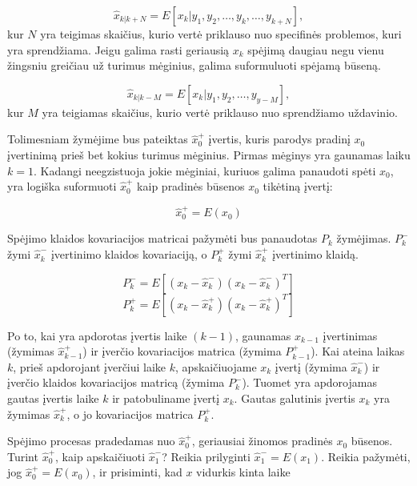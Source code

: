     \begin{equation}
        \hat{x}_{k|k+N} = E[x_k|y_1,y_2,\dots,y_k,\dots, y_{k+N}],
    \end{equation}
    kur $N$ yra teigimas skaičius, kurio vertė priklauso nuo specifinės problemos, kuri yra sprendžiama.
    Jeigu galima rasti geriausią $x_k$ spėjimą daugiau negu vienu žingsniu greičiau už turimus mėginius, galima suformuluoti spėjamą būseną.

    \begin{equation}
        \hat{x}_{k|k-M} = E[x_k|y_1,y_2, \dots, y_{y-M}],
    \end{equation}
    kur $M$ yra teigiamas skaičius, kurio vertė priklauso nuo sprendžiamo uždavinio.

    Tolimesniam žymėjime bus pateiktas $\hat{x}_0^+$ įvertis, kuris parodys pradinį $x_0$ įvertinimą prieš bet kokius turimus mėginius.
    Pirmas mėginys yra gaunamas laiku $k=1$.
    Kadangi neegzistuoja jokie mėginiai, kuriuos galima panaudoti spėti $x_0$, yra logiška suformuoti $\hat{x}^+_0$ kaip pradinės būsenos $x_0$ tikėtiną įvertį:

    \begin{equation}
        \hat{x}_0^+ = E(x_0)
    \end{equation}

    Spėjimo klaidos kovariacijos matricai pažymėti bus panaudotas $P_k$ žymėjimas.
    $P_k^-$ žymi $\hat{x}_k^-$ įvertinimo klaidos kovariaciją, o $P_k^+$ žymi $\hat{x}_k^+$ įvertinimo klaidą.

    \begin{equation}
        P_k^- = E[(x_k - \hat{x}_k^-)(x_k - \hat{x}_k^-)^T]
    \end{equation}
    \begin{equation}
        P_k^+ = E[(x_k - \hat{x}_k^+)(x_k-\hat{x}_k^+)^T]
    \end{equation}

    Po to, kai yra apdorotas įvertis laike $(k-1)$, gaunamas $x_{k-1}$ įvertinimas (žymimas $\hat{x}_{k-1}^+$) ir įverčio kovariacijos matrica (žymima $P_{k-1}^+$).
    Kai ateina laikas $k$, prieš apdorojant įverčiui laike $k$, apskaičiuojame $x_k$ įvertį (žymima $\hat{x}_k^-$) ir įverčio klaidos kovariacijos matricą (žymima $P_k^-$).
    Tuomet yra apdorojamas gautas įvertis laike $k$ ir patobuliname įvertį $x_k$.
    Gautas galutinis įvertis $x_k$ yra žymimas $\hat{x}_k^+$, o jo kovariacijos matrica $P_k^+$.

    Spėjimo procesas pradedamas nuo $\hat{x}_0^+$, geriausiai žinomos pradinės $x_0$ būsenos.
    Turint $\hat{x}_0^+$, kaip apskaičiuoti $\hat{x}_1^-$?
    Reikia prilyginti $\hat{x}_1^- = E(x_1)$.
    Reikia pažymėti, jog $\hat{x}_0^+ = E(x_0)$, ir prisiminti, kad $x$ vidurkis kinta laike

